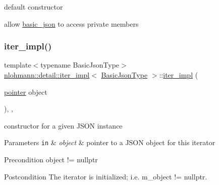 default constructor 

allow \hyperlink{classnlohmann_1_1basic__json}{basic\+\_\+json} to access private members \mbox{\label{classnlohmann_1_1detail_1_1iter__impl_a88a00484ac201c52fc5f613d88a2918b}} 
\subsubsection{\texorpdfstring{iter\+\_\+impl()}{iter\_impl()}\hspace{0.1cm}{\footnotesize\ttfamily [2/4]}}
{\footnotesize\ttfamily template$<$typename Basic\+Json\+Type$>$ \\
\hyperlink{classnlohmann_1_1detail_1_1iter__impl}{nlohmann\+::detail\+::iter\+\_\+impl}$<$ \hyperlink{classnlohmann_1_1detail_1_1iter__impl_abf18f18793f84b0222aebb5a2a87da7a}{Basic\+Json\+Type} $>$\+::\hyperlink{classnlohmann_1_1detail_1_1iter__impl}{iter\+\_\+impl} (\begin{DoxyParamCaption}\item[{\hyperlink{classnlohmann_1_1detail_1_1iter__impl_a69e52f890ce8c556fd68ce109e24b360}{pointer}}]{object }\end{DoxyParamCaption})\hspace{0.3cm}{\ttfamily [inline]}, {\ttfamily [explicit]}, {\ttfamily [noexcept]}}



constructor for a given J\+S\+ON instance 


\begin{DoxyParams}[1]{Parameters}
\mbox{\tt in}  & {\em object} & pointer to a J\+S\+ON object for this iterator \\
\hline
\end{DoxyParams}
\begin{DoxyPrecond}{Precondition}
object != nullptr 
\end{DoxyPrecond}
\begin{DoxyPostcond}{Postcondition}
The iterator is initialized; i.\+e. {\ttfamily m\+\_\+object != nullptr}. 
\end{DoxyPostcond}
\mbox{\label{classnlohmann_1_1detail_1_1iter__impl_a71f84fb6e009619f12972bcf9002b8cd}} 
